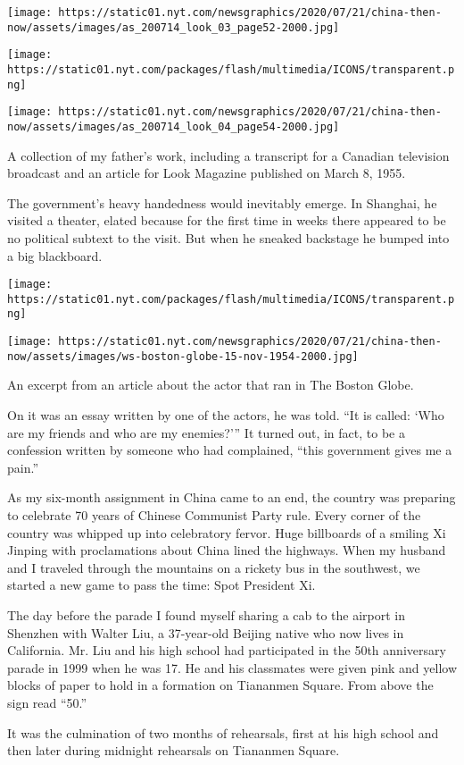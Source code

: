 \texttt{[image: https://static01.nyt.com/newsgraphics/2020/07/21/china-then-now/assets/images/as\_200714\_look\_03\_page52-2000.jpg]}

\texttt{[image: https://static01.nyt.com/packages/flash/multimedia/ICONS/transparent.png]}

\texttt{[image: https://static01.nyt.com/newsgraphics/2020/07/21/china-then-now/assets/images/as\_200714\_look\_04\_page54-2000.jpg]}

A collection of my father's work, including a transcript for a Canadian
television broadcast and an article for Look Magazine published on March
8, 1955.

The government's heavy handedness would inevitably emerge. In Shanghai,
he visited a theater, elated because for the first time in weeks there
appeared to be no political subtext to the visit. But when he sneaked
backstage he bumped into a big blackboard.

\texttt{[image: https://static01.nyt.com/packages/flash/multimedia/ICONS/transparent.png]}

\texttt{[image: https://static01.nyt.com/newsgraphics/2020/07/21/china-then-now/assets/images/ws-boston-globe-15-nov-1954-2000.jpg]}

An excerpt from an article about the actor that ran in The Boston Globe.

On it was an essay written by one of the actors, he was told. ``It is
called: `Who are my friends and who are my enemies?''' It turned out, in
fact, to be a confession written by someone who had complained, ``this
government gives me a pain.''

As my six-month assignment in China came to an end, the country was
preparing to celebrate 70 years of Chinese Communist Party rule. Every
corner of the country was whipped up into celebratory fervor. Huge
billboards of a smiling Xi Jinping with proclamations about China lined
the highways. When my husband and I traveled through the mountains on a
rickety bus in the southwest, we started a new game to pass the time:
Spot President Xi.

The day before the parade I found myself sharing a cab to the airport in
Shenzhen with Walter Liu, a 37-year-old Beijing native who now lives in
California. Mr. Liu and his high school had participated in the 50th
anniversary parade in 1999 when he was 17. He and his classmates were
given pink and yellow blocks of paper to hold in a formation on
Tiananmen Square. From above the sign read ``50.''

It was the culmination of two months of rehearsals, first at his high
school and then later during midnight rehearsals on Tiananmen Square.

